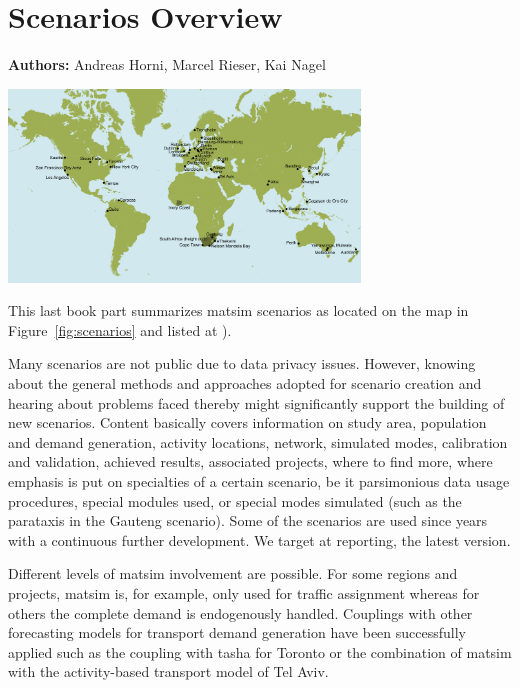 \chapter{Scenarios Overview}
\label{ch:scenarios}

\hfill \textbf{Authors:} Andreas Horni, Marcel Rieser, Kai Nagel

\begin{center} \includegraphics[width=0.7\textwidth, angle=0]{./scenarios/figures/MATSimModelsMap} \end{center}

This last book part summarizes \gls{matsim} scenarios as located on the map in Figure~\ref{fig:scenarios} and listed at \citet[][]{MATSIM-Scenarios_Webpage_2015}).

Many scenarios are not public due to data privacy issues. However, knowing about the general methods and approaches adopted for scenario creation and hearing about problems faced thereby might significantly support the building of new scenarios. Content basically covers information on study area, population and demand generation, activity locations, network, simulated modes, calibration and validation, achieved results, associated projects, where to find more, where emphasis is put on specialties of a certain scenario, be it parsimonious data usage procedures, special modules used, or special modes simulated (such as the parataxis in the Gauteng scenario). Some of the scenarios are used since years with a continuous further development. We target at reporting, the latest version. 

Different levels of \gls{matsim} involvement are possible. For some regions and projects, \gls{matsim} is, for example, only used for traffic assignment whereas for others the complete demand is endogenously handled. Couplings with other forecasting models for transport demand generation have been successfully applied such as the coupling with \gls{tasha} for Toronto or the combination of \gls{matsim} with the activity-based transport model of Tel Aviv.

